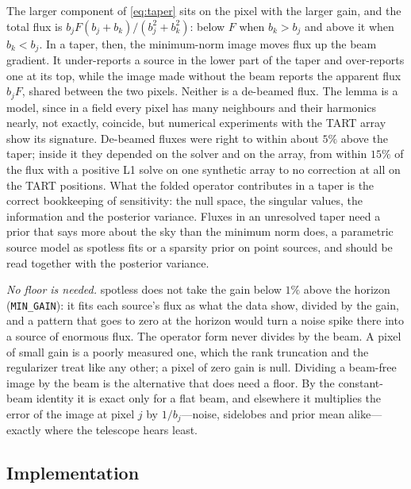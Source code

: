 \documentclass[11pt,a4paper]{article}
\begin{document}
The larger component of \eqref{eq:taper} sits on the pixel with the larger
gain, and the total flux is $b_jF(b_j+b_k)/(b_j^{2}+b_k^{2})$: below $F$ when
$b_k>b_j$ and above it when $b_k<b_j$. In a taper, then, the minimum-norm
image moves flux up the beam gradient. It under-reports a source in the lower
part of the taper and over-reports one at its top, while the image made
without the beam reports the apparent flux $b_jF$, shared between the two
pixels. Neither is a de-beamed flux. The lemma is a model, since in a field
every pixel has many neighbours and their harmonics nearly, not exactly,
coincide, but numerical experiments with the TART array show its signature.
De-beamed fluxes were right to within about $5\%$ above the taper; inside it
they depended on the solver and on the array, from within $15\%$ of the flux
with a positive L1 solve on one synthetic array to no correction at all on
the TART positions. What the folded operator contributes in a taper is the
correct bookkeeping of sensitivity: the null space, the singular values, the
information and the posterior variance. Fluxes in an unresolved taper need a
prior that says more about the sky than the minimum norm does, a parametric
source model as spotless fits or a sparsity prior on point sources, and
should be read together with the posterior variance.

\emph{No floor is needed.} spotless does not take the gain below $1\%$ above
the horizon (\texttt{MIN\_GAIN}): it fits each source's flux as what the data
show, divided by the gain, and a pattern that goes to zero at the horizon
would turn a noise spike there into a source of enormous flux. The operator
form never divides by the beam. A pixel of small gain is a poorly measured
one, which the rank truncation and the regularizer treat like any other; a
pixel of zero gain is null. Dividing a beam-free image by the beam is the
alternative that does need a floor. By the constant-beam identity it is exact
only for a flat beam, and elsewhere it multiplies the error of the image at
pixel $j$ by $1/b_j$---noise, sidelobes and prior mean alike---exactly where
the telescope hears least.

\subsection{Implementation}
\label{sec:beamimpl}
\end{document}
